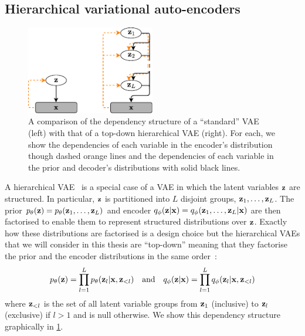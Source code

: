 \subsection{Hierarchical variational auto-encoders}
\label{sec:hierarchical-vae}
\begin{figure}
    \centering
    \includegraphics[width=0.5\textwidth]{figs/thesis/vae-vs-hierarchical-vae.pdf}
    \caption{A comparison of the dependency structure of a ``standard'' VAE (left) with that of a top-down hierarchical VAE (right). For each, we show the dependencies of each variable in the encoder's distribution though dashed orange lines and the dependencies of each variable in the prior and decoder's distributions with solid black lines.}
    \label{fig:vae-vs-hierarchical-vae}
\end{figure}
A hierarchical VAE~\citep{gregor2015draw,kingma2016improving,sonderby2016ladder,klushyn2019learning} is a special case of a VAE in which the latent variables ${\mathbf{z}}$ are structured. In particular, ${\mathbf{z}}$ is partitioned into $L$ disjoint groups, ${\mathbf{z}}_1,\ldots,{\mathbf{z}}_L$. The prior $p_\theta({\mathbf{z}}) = p_\theta({\mathbf{z}}_1,\ldots,{\mathbf{z}}_L)$ and encoder $q_\phi({\mathbf{z}}|{\mathbf{x}}) = q_\phi({\mathbf{z}}_1,\ldots,{\mathbf{z}}_L|{\mathbf{x}})$ are then factorised to enable them to represent structured distributions over ${\mathbf{z}}$. Exactly how these distributions are factorised is a design choice but the hierarchical VAEs that we will consider in this thesis are ``top-down'' meaning that they factorise the prior and the encoder distributions in the same order~\citep{vahdat2020nvae,child2020very}:
\begin{equation} \label{eq:hierarchical-vae-factorisations}
    p_\theta({\mathbf{z}}) = \prod_{l=1}^L p_\theta({\mathbf{z}}_l|{\mathbf{x}},{\mathbf{z}}_{<l}) \quad \text{and} \quad q_\phi({\mathbf{z}}|{\mathbf{x}}) = \prod_{l=1}^L q_\phi({\mathbf{z}}_l|{\mathbf{x}},{\mathbf{z}}_{<l})
\end{equation}
where ${\mathbf{z}}_{<l}$ is the set of all latent variable groups from ${\mathbf{z}}_1$ (inclusive) to ${\mathbf{z}}_{l}$ (exclusive) if $l > 1$ and is null otherwise. We show this dependency structure graphically in \cref{fig:vae-vs-hierarchical-vae}.

